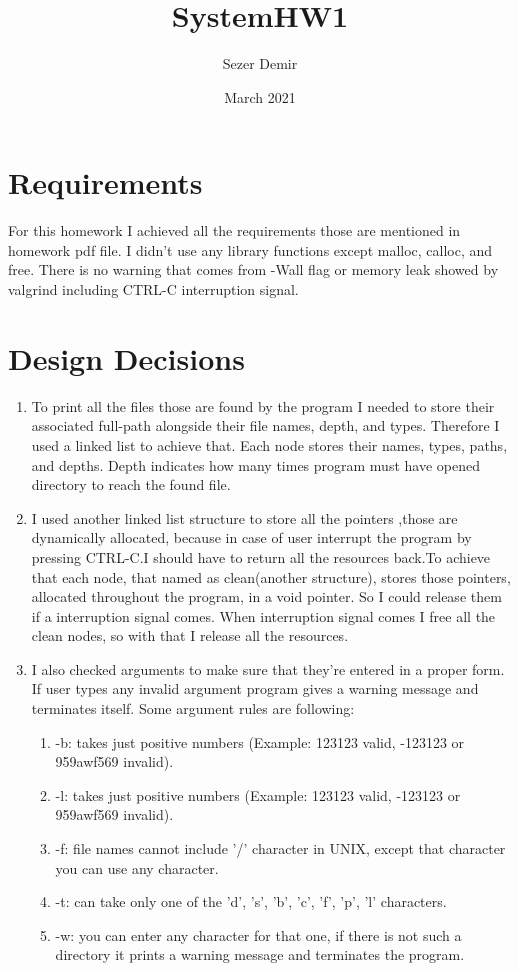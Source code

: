 \documentclass{article}
\title{SystemHW1}
\author{Sezer Demir }
\date{March 2021}
\begin{document}
\maketitle
\section{Requirements}

\setlength{\parindent}{8ex}
\hspace{\parindent} For this homework I achieved all the requirements those are mentioned in homework pdf file. I didn't use any library functions except malloc, calloc, and free. There is no warning that comes from -Wall flag or memory leak showed by valgrind including CTRL-C interruption signal. \par
\section{Design Decisions}

\begin{enumerate}[label=\alph*.), leftmargin=1.5\parindent]
  \item To print all the files those are found by the program I needed to store their associated full-path alongside their file names, depth, and types. 
  Therefore I used a linked list to achieve that. Each node stores their names, types, paths, and depths. Depth indicates how many times program must
  have opened directory to reach the found file.
  \item I used another linked list structure to store all the pointers ,those are dynamically allocated, because in case of user interrupt the program
  by pressing CTRL-C.I should have to return all the resources back.To achieve that each node, that named as clean(another structure), stores those pointers, allocated throughout the program, in a void pointer. So I could release them if a interruption signal comes. When interruption signal comes I free all the clean nodes, so with that I release all the resources.
  \item I also checked arguments to make sure that they're entered in a proper form. If user types any invalid argument program gives a warning message and terminates itself. Some argument rules are following:
  \begin{enumerate}[label =\arabic*), leftmargin=1.5\parindent]
    \item -b: takes just positive numbers (Example: 123123 valid, -123123 or 959awf569 invalid).
    \item -l: takes just positive numbers (Example: 123123 valid, -123123 or 959awf569 invalid).
    \item -f: file names cannot include '/' character in UNIX, except that character you can use any character.
    \item -t: can take only one of the 'd', 's', 'b', 'c', 'f', 'p', 'l' characters.
    \item -w: you can enter any character for that one, if there is not such a directory it prints a warning message and terminates the program.
  \end{enumerate}
\end{enumerate}
\end{document}
